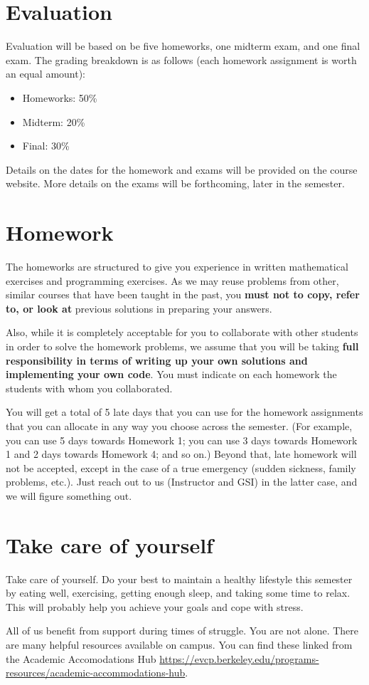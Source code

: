 \documentclass[11pt]{article}
\begin{document}
\section*{Evaluation}

Evaluation will be based on be five homeworks, one midterm exam, and one final
exam. The grading breakdown is as follows (each homework assignment is worth an
equal amount):    

\begin{itemize}
\item Homeworks: 50\% 
\item Midterm: 20\%
\item Final: 30\%
\end{itemize}

Details on the dates for the homework and exams will be provided on the course
website. More details on the exams will be forthcoming, later in the semester.

\section*{Homework}
 
The homeworks are structured to give you experience in written mathematical
exercises and programming exercises. As we may reuse problems from other,
similar courses that have been taught in the past, you \textbf{must not to copy,
  refer to, or look at} previous solutions in preparing your answers.

Also, while it is completely acceptable for you to collaborate with other
students in order to solve the homework problems, we assume that you will be
taking \textbf{full responsibility in terms of writing up your own solutions and
implementing your own code}. You must indicate on each homework the students
with whom you collaborated.

You will get a total of 5 late days that you can use for the homework
assignments that you can allocate in any way you choose across the
semester. (For example, you can use 5 days towards Homework 1; you can use 3
days towards Homework 1 and 2 days towards Homework 4; and so on.) Beyond that,
late homework will not be  accepted, except in the case of a true emergency
(sudden sickness, family problems, etc.). Just reach out to us (Instructor and
GSI) in the latter case, and we will figure something out.

\section*{Take care of yourself}

Take care of yourself. Do your best to maintain a healthy lifestyle this
semester by eating well, exercising, getting enough sleep, and taking some time
to relax. This will probably help you achieve your goals and cope with stress.

All of us benefit from support during times of struggle. You are not alone.
There are many helpful resources available on campus. You can find these linked
from the Academic Accomodations Hub 
\url{https://evcp.berkeley.edu/programs-resources/academic-accommodations-hub}.
\end{document}
